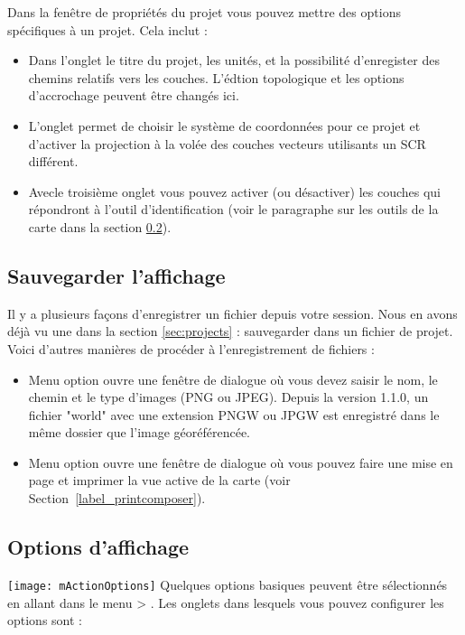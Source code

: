 Dans la fenêtre de propriétés du projet vous pouvez mettre des options spécifiques à un projet. Cela inclut :
\begin{itemize}
 \item Dans l'onglet  le titre du projet, les unités, et la possibilité d'enregister des chemins relatifs vers les couches. L'édtion topologique et les options d'accrochage peuvent être changés ici.
\item L'onglet  permet de choisir le système de coordonnées pour ce projet et d'activer la projection à la volée des couches vecteurs utilisants un SCR différent.
\item Avecle troisième onglet  vous pouvez activer (ou désactiver) les couches qui répondront à l'outil d'identification (voir le paragraphe sur les outils de la carte dans la section \ref{subsec:gui_options}).
\end{itemize}

\subsection{Sauvegarder l'affichage}\label{sec:output}
Il y a plusieurs façons d'enregistrer un fichier depuis votre session. Nous en avons déjà vu une dans la section \ref{sec:projects} : sauvegarder dans un fichier de projet.
Voici d'autres manières de procéder à l'enregistrement de fichiers :
\begin{itemize}
\item Menu option  ouvre une fenêtre de dialogue où vous devez saisir le nom, le chemin et le type d'images (PNG ou JPEG). Depuis la version 1.1.0, un fichier "world" avec une extension PNGW ou JPGW est enregistré dans le même dossier que l'image géoréférencée.
\item Menu option  ouvre une fenêtre de dialogue où vous pouvez faire une mise en page et imprimer la vue active de la carte (voir Section~\ref{label_printcomposer}).
\end{itemize}

\subsection{Options d'affichage}\label{subsec:gui_options}
\texttt{[image: mActionOptions]} 
Quelques options basiques peuvent être sélectionnés en allant dans le menu  >
. Les onglets dans lesquels vous pouvez configurer les options sont :

